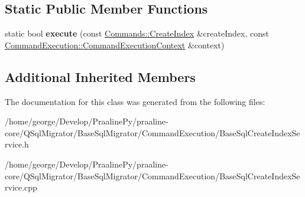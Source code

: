 \subsection*{Static Public Member Functions}
\begin{DoxyCompactItemize}
\item 
\mbox{\label{class_q_sql_migrator_1_1_command_execution_1_1_base_sql_create_index_service_a13ba80aa91fee14ddab190edca1be7c3}} 
static bool {\bfseries execute} (const \hyperlink{class_q_sql_migrator_1_1_commands_1_1_create_index}{Commands\+::\+Create\+Index} \&create\+Index, const \hyperlink{class_q_sql_migrator_1_1_command_execution_1_1_command_execution_context}{Command\+Execution\+::\+Command\+Execution\+Context} \&context)
\end{DoxyCompactItemize}
\subsection*{Additional Inherited Members}


The documentation for this class was generated from the following files\+:\begin{DoxyCompactItemize}
\item 
/home/george/\+Develop/\+Praaline\+Py/praaline-\/core/\+Q\+Sql\+Migrator/\+Base\+Sql\+Migrator/\+Command\+Execution/Base\+Sql\+Create\+Index\+Service.\+h\item 
/home/george/\+Develop/\+Praaline\+Py/praaline-\/core/\+Q\+Sql\+Migrator/\+Base\+Sql\+Migrator/\+Command\+Execution/Base\+Sql\+Create\+Index\+Service.\+cpp\end{DoxyCompactItemize}
